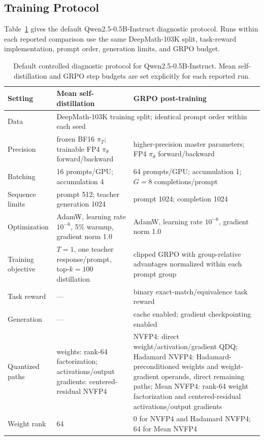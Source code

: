 \documentclass[letterpaper]{article}
\begin{document}
\subsection{Training Protocol}

Table~\ref{tab:protocol} gives the default Qwen2.5-0.5B-Instruct diagnostic protocol. Runs within each reported comparison use the same DeepMath-103K split, task-reward implementation, prompt order, generation limits, and GRPO budget.

\begin{table}[!t]
\centering
\small
\caption{Default controlled diagnostic protocol for Qwen2.5-0.5B-Instruct. Mean self-distillation and GRPO step budgets are set explicitly for each reported run.}
\label{tab:protocol}
\begin{tabular}{@{}p{}p{}p{}@{}}
\toprule
Setting & Mean self-distillation & GRPO post-training \\
\midrule
Data & \multicolumn{2}{l}{DeepMath-103K training split; identical prompt order within each seed} \\
Precision & frozen BF16 $\pi_T$; trainable FP4 $\pi_\theta$ forward/backward & higher-precision master parameters; FP4 $\pi_\theta$ forward/backward \\
Batching & 16 prompts/GPU; accumulation 4 & 64 prompts/GPU; accumulation 1; $G=8$ completions/prompt \\
Sequence limits & prompt 512; teacher generation 1024 & prompt 1024; completion 1024 \\
Optimization & AdamW, learning rate $10^{-6}$, 5\% warmup, gradient norm 1.0 & AdamW, learning rate $10^{-6}$, gradient norm 1.0 \\
Training objective & $T=1$, one teacher response/prompt, top-$k=100$ distillation & clipped GRPO with group-relative advantages normalized within each prompt group \\
Task reward & --- & binary exact-match/equivalence task reward \\
Generation & --- & cache enabled; gradient checkpointing enabled \\
Quantized paths & weights: rank-64 factorization; activations/output gradients: centered-residual NVFP4 & NVFP4: direct weight/activation/gradient QDQ; Hadamard NVFP4: Hadamard-preconditioned weights and weight-gradient operands, direct remaining paths; Mean NVFP4: rank-64 weight factorization and centered-residual activations/output gradients \\
Weight rank & 64 & 0 for NVFP4 and Hadamard NVFP4; 64 for Mean NVFP4 \\
\bottomrule
\end{tabular}
\end{table}
\end{document}
